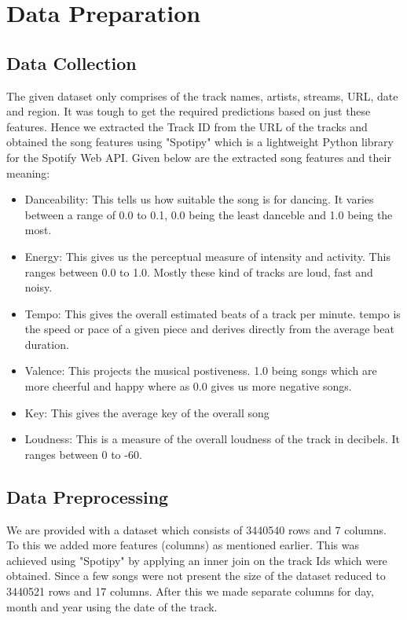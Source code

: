 \documentclass{article}
\begin{document}
\section{Data Preparation}

\subsection{Data Collection}
The given dataset only comprises of the track names, artists, streams, URL, date and region. It was tough to get the required predictions based on just these features. Hence we extracted the Track ID from the URL of the tracks and obtained the song features using "Spotipy" which is a lightweight Python library for the Spotify Web API. Given below are the extracted song features and their meaning:

\begin{itemize}
    \item Danceability: This tells us how suitable the song is for dancing. It varies between a range of 0.0 to 0.1, 0.0 being the least danceble and 1.0 being the most.
    \item Energy: This gives us the perceptual measure of intensity and activity. This ranges between 0.0 to 1.0. Mostly these kind of tracks are loud, fast and noisy.
    \item Tempo: This gives the overall estimated beats of a track per minute. tempo is the speed or pace of a given piece and derives directly from the average beat duration.
    \item Valence: This projects the musical postiveness. 1.0 being songs which are more cheerful and happy where as 0.0 gives us more negative songs.
    \item Key: This gives the average key of the overall song
    \item Loudness: This is a measure of the overall loudness of the track in decibels. It ranges between 0 to -60.
    
\end{itemize}

\subsection{Data Preprocessing}

We are provided with a dataset which consists of 3440540 rows and 7 columns. To this we added more features (columns) as mentioned earlier. This was achieved using "Spotipy" by applying an inner join on the track Ids which were obtained. Since a few songs were not present the size of the dataset reduced to 3440521 rows and 17 columns. After this we made separate columns for day, month and year using the date of the track. 
\end{document}

